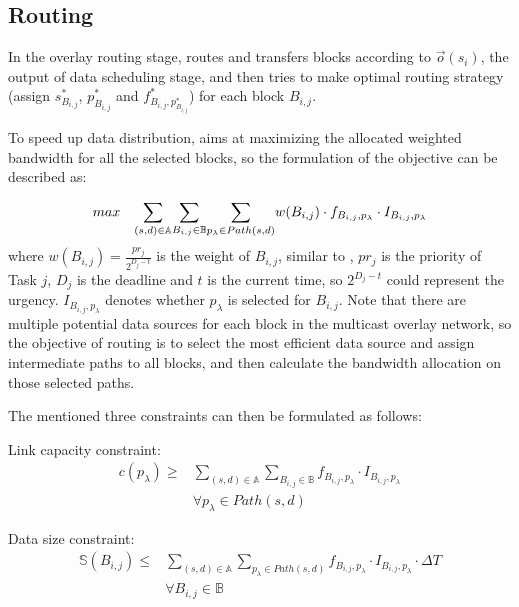 \subsection{Routing}
\label{subsec:logic:routing}

In the overlay routing stage, \name routes and transfers blocks according to $\overrightarrow{o}(s_i)$, the output of data scheduling stage, and then tries to make optimal routing strategy (assign $s_{B_{i,j}}^*$, $p_{B_{i,j}}^*$ and $f^*_{B_{i,j},p_{B_{i,j}}^*}$) for each block $B_{i,j}$.

To speed up data distribution, \name aims at maximizing the allocated weighted bandwidth for all the selected blocks, so the formulation of the objective can be described as:

\begin{equation}
\centering
max \quad \displaystyle{\sum_{(s,d)\in \mathbb{A}}} \displaystyle{\sum_{B_{i,j} \in \mathbb{B}}} \displaystyle{\sum_{p_{\lambda}\in Path(s,d)}} w(B_{i,j})\cdot f_{B_{i,j},p_\lambda} \cdot I_{B_{i,j},p_\lambda}
\end{equation}
where $w(B_{i,j}) = \frac{pr_j}{2^{D_j-t}}$ is the weight of $B_{i,j}$, similar to \cite{zhang2015guaranteeing}, $pr_j$ is the priority of Task $j$, $D_j$ is the deadline and $t$ is the current time, so $2^{D_j-t}$ could represent the urgency. $I_{B_{i,j},p_\lambda}$ denotes whether $p_\lambda$ is selected for $B_{i,j}$. Note that there are multiple potential data sources for each block in the multicast overlay network, so the objective of routing is to select the most efficient data source and assign intermediate paths to all blocks, and then calculate the bandwidth allocation on those selected paths.

The mentioned three constraints can then be formulated as follows:

Link capacity constraint:
\begin{equation}
\begin{split}
c(p_\lambda) \geq & \displaystyle{\sum_{(s,d)\in \mathbb{A}}} \displaystyle{\sum_{B_{i,j} \in \mathbb{B}}} f_{B_{i,j},p_\lambda} \cdot I_{B_{i,j},p_\lambda}\\
& \forall p_\lambda \in Path(s,d) \label{st:capacity}
\end{split}
\end{equation}

Data size constraint:
\begin{equation}
\begin{split}
\mathbb{S}(B_{i,j}) \leq & \displaystyle{\sum_{(s,d)\in \mathbb{A}}} \displaystyle{\sum_{p_{\lambda}\in Path(s,d)}} f_{B_{i,j},p_\lambda} \cdot I_{B_{i,j},p_\lambda} \cdot \Delta T\\
& \forall B_{i,j} \in \mathbb{B} \label{st:size}\\
\end{split}
\end{equation}

